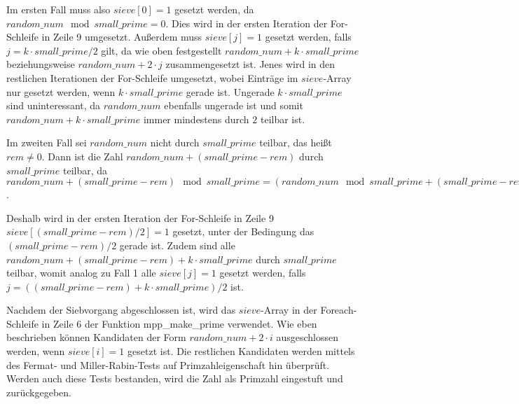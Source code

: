 Im ersten Fall muss also $sieve[0] = 1$ gesetzt werden, da $random\_num \mod small\_prime = 0$.
Dies wird in der ersten Iteration der For-Schleife in Zeile 9 umgesetzt.
Außerdem muss $sieve[j] = 1$ gesetzt werden, falls $j = k \cdot small\_prime / 2$ gilt, da wie oben festgestellt $random\_num + k \cdot small\_prime$ beziehungsweise $random\_num + 2 \cdot j$ zusammengesetzt ist.
Jenes wird in den restlichen Iterationen der For-Schleife umgesetzt, wobei Einträge im $sieve$-Array nur gesetzt werden, wenn $k \cdot small\_prime$ gerade ist.
Ungerade $k \cdot small\_prime$ sind uninteressant, da $random\_num$ ebenfalls ungerade ist und somit $random\_num + k \cdot small\_prime$ immer mindestens durch $2$ teilbar ist.

Im zweiten Fall sei $random\_num$ nicht durch $small\_prime$ teilbar, das heißt $rem \neq 0$.
Dann ist die Zahl $random\_num + (small\_prime - rem)$ durch $small\_prime$ teilbar, da $random\_num + (small\_prime - rem) \mod small\_prime = (random\_num \mod small\_prime + (small\_prime - rem)) \mod small\_prime = (rem + (small\_prime - rem)) = 0$.

Deshalb wird in der ersten Iteration der For-Schleife in Zeile 9 $sieve[(small\_prime - rem)/2] = 1$ gesetzt, unter der Bedingung das $(small\_prime - rem)/2$ gerade ist.
Zudem sind alle $random\_num + (small\_prime - rem) + k \cdot small\_prime$ durch $small\_prime$ teilbar, womit analog zu Fall 1 alle $sieve[j] = 1$ gesetzt werden, falls $j = ((small\_prime - rem) + k \cdot small\_prime) / 2$ ist.



\begin{algorithm}[h]
\DontPrintSemicolon
\caption{Pseudo-Code für mpp_sieve in Mozilla NSS}
\label{alg:sievePrimeGenerationNSS}
\end{algorithm}

Nachdem der Siebvorgang abgeschlossen ist, wird das $sieve$-Array in der Foreach-Schleife in Zeile 6 der Funktion mpp_make_prime verwendet.
Wie eben beschrieben können Kandidaten der Form $random\_num + 2 \cdot i$ ausgeschlossen werden, wenn $sieve[i] = 1$ gesetzt ist.
Die restlichen Kandidaten werden mittels des Fermat- und Miller-Rabin-Tests auf Primzahleigenschaft hin überprüft.
Werden auch diese Tests bestanden, wird die Zahl als Primzahl eingestuft und zurückgegeben.

